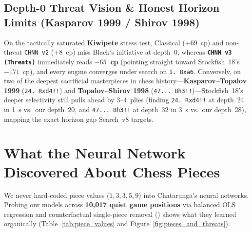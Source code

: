 \documentclass[10.5pt,letterpaper]{article}
\begin{document}
\subsection{Depth-0 Threat Vision \& Honest Horizon Limits (Kasparov 1999 / Shirov 1998)}

On the tactically saturated \textbf{Kiwipete} stress test, Classical ($+69$~cp) and non-threat \texttt{CHNN v2} ($+8$~cp) miss Black's initiative at depth~0, whereas \textbf{\texttt{CHNN v3 (Threats)}} immediately reads \textbf{$-65$~cp} (pointing straight toward Stockfish~18's $-171$~cp), and every engine converges under search on \texttt{1. Bxa6}. Conversely, on two of the deepest sacrificial masterpieces in chess history—\textbf{Kasparov--Topalov 1999} (\texttt{24. Rxd4!!}) and \textbf{Topalov--Shirov 1998} (\texttt{47... Bh3!!})—Stockfish~18's deeper selectivity still pulls ahead by 3--4~plies (finding \texttt{24. Rxd4!!} at depth~24 in 1~s vs.\ our depth~20, and \texttt{47... Bh3!!} at depth~32 in 3~s vs.\ our depth~28), mapping the exact horizon gap Search~v8 targets.

\section{What the Neural Network Discovered About Chess Pieces}

We never hard-coded piece values ($1,3,3,5,9$) into Chatarunga's neural networks. Probing our models across \textbf{10,017 quiet game positions} via balanced OLS regression and counterfactual single-piece removal () shows what they learned organically (Table~\ref{tab:piece_values} and Figure~\ref{fig:pieces_and_threats}).
\end{document}
